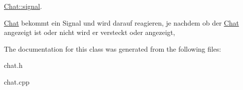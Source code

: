 \hyperlink{class_chat_a7b94bde4d4e53034b558a0aa0b8b76eb}{Chat\+::signal}. 

\hyperlink{class_chat}{Chat} bekommt ein Signal und wird darauf reagieren, je nachdem ob der \hyperlink{class_chat}{Chat} angezeigt ist oder nicht wird er versteckt oder angezeigt, 

The documentation for this class was generated from the following files\+:\begin{DoxyCompactItemize}
\item 
chat.\+h\item 
chat.\+cpp\end{DoxyCompactItemize}
